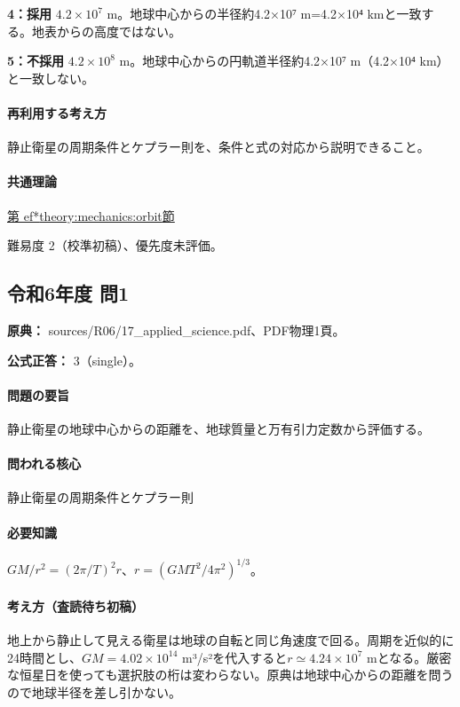 \noindent\textbf{4：採用} \(4.2\times10^7\) m。地球中心からの半径約4.2×10⁷ m=4.2×10⁴ kmと一致する。地表からの高度ではない。\par

\noindent\textbf{5：不採用} \(4.2\times10^8\) m。地球中心からの円軌道半径約4.2×10⁷ m（4.2×10⁴ km）と一致しない。\par

\paragraph{再利用する考え方} 静止衛星の周期条件とケプラー則を、条件と式の対応から説明できること。

\paragraph{共通理論} \hyperref[theory:mechanics:orbit]{第
ef*{theory:mechanics:orbit}節}

\par 難易度 2（校準初稿）、優先度未評価。

\subsection{令和6年度 問1}
\label{q:r06-reg-applied-01}

\noindent\textbf{原典：} sources/R06/17\_applied\_science.pdf、PDF物理1頁。

\textbf{公式正答：} 3（single）。

\paragraph{問題の要旨} 静止衛星の地球中心からの距離を、地球質量と万有引力定数から評価する。

\paragraph{問われる核心} 静止衛星の周期条件とケプラー則

\paragraph{必要知識} \(GM/r^2=(2\pi/T)^2r\)、\(r=(GMT^2/4\pi^2)^{1/3}\)。

\paragraph{考え方（査読待ち初稿）} 地上から静止して見える衛星は地球の自転と同じ角速度で回る。周期を近似的に24時間とし、\(GM=4.02\times10^{14}\) m³/s²を代入すると\(r\simeq4.24\times10^7\) mとなる。厳密な恒星日を使っても選択肢の桁は変わらない。原典は地球中心からの距離を問うので地球半径を差し引かない。

